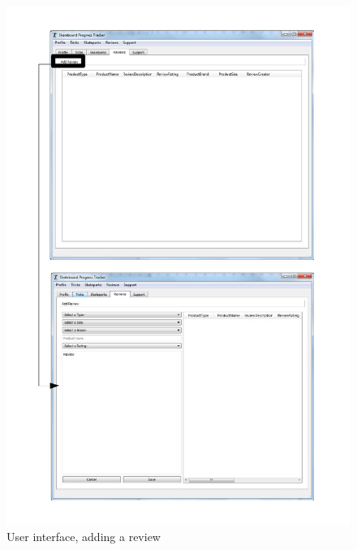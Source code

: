 \begin{figure}[H]
    \includegraphics[width=\textwidth]{./Maintenance/Figures/AddReview.pdf}
    \caption{User interface, adding a review} \label{fig:Add Review UI}
\end{figure}


